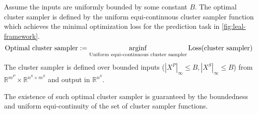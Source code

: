 \begin{definition}
    Assume the inputs are uniformly bounded by some constant $B$. 
    The optimal cluster sampler is defined by the uniform equi-continuous cluster sampler function which achieves the minimal optimization loss for the prediction task in \cref{fig:leal-framework}.
    \begin{equation}
        \textrm{Optimal cluster sampler} := \operatorname*{\arg\!\inf}_{\textrm{Uniform equi-continuous cluster sampler}} \textrm{Loss}(\textrm{cluster sampler})
    \end{equation}
    The cluster sampler is defined over bounded inputs ($|X^P|_{\infty} \leq B, |X^S|_{\infty} \leq B$) from $\mathbb{R}^{m^P} \times \mathbb{R}^{n^S \times m^S}$ and output in $\mathbb{R}^{n^S}$.
\end{definition}

\begin{remark}
    The existence of such optimal cluster sampler is guaranteed by the boundedness and uniform equi-continuity of the set of cluster sampler functions. 
\end{remark}


\thmclustersampler*

